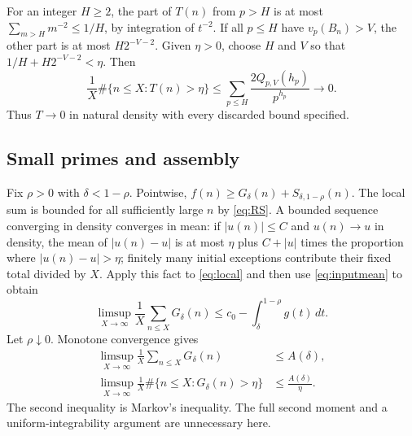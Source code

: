 \documentclass[10pt]{article}
\theoremstyle{remark}
\begin{document}
For an integer $H\geq2$, the part of $T(n)$ from $p>H$ is at most
$\sum_{m>H}m^{-2}\leq1/H$, by integration of $t^{-2}$.
If all $p\leq H$ have $v_p(B_n)>V$, the other part is at most
$H2^{-V-2}$. Given $\eta>0$, choose $H$ and $V$ so that
$1/H+H2^{-V-2}<\eta$. Then
\[
 \frac1X\#\{n\leq X:T(n)>\eta\}
 \leq\sum_{p\leq H}\frac{2Q_{p,V}(h_p)}{p^{h_p}}\longrightarrow0.
\]
Thus $T\to0$ in natural density with every discarded bound specified.

\subsection{Small primes and assembly}\label{subsec:G}
Fix $\rho>0$ with $\delta<1-\rho$. Pointwise,
$f(n)\geq G_\delta(n)+S_{\delta,1-\rho}(n)$.
The local sum is bounded for all sufficiently large $n$ by
\eqref{eq:RS}. A bounded sequence converging in density converges
in mean: if $|u(n)|\leq C$ and $u(n)\to u$ in density, the mean of
$|u(n)-u|$ is at most $\eta$ plus $C+|u|$ times the proportion where
$|u(n)-u|>\eta$; finitely many initial exceptions contribute their
fixed total divided by $X$. Apply this fact to \eqref{eq:local} and
then use \eqref{eq:inputmean} to obtain
\[
 \limsup_{X\to\infty}\frac1X\sum_{n\leq X}G_\delta(n)
 \leq c_0-\int_\delta^{1-\rho}g(t)\,dt.
\]
Let $\rho\downarrow0$. Monotone convergence gives
\begin{equation}\label{eq:G}
 \begin{aligned}
 \limsup_{X\to\infty}\frac1X\sum_{n\leq X}G_\delta(n)&\leq A(\delta),\\
 \limsup_{X\to\infty}\frac1X\#\{n\leq X:G_\delta(n)>\eta\}
 &\leq\frac{A(\delta)}\eta.
 \end{aligned}
\end{equation}
The second inequality is Markov's inequality. The full second moment
and a uniform-integrability argument are unnecessary here.
\end{document}
